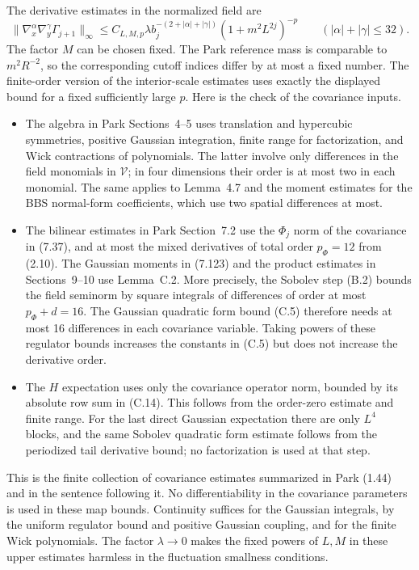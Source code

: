 \documentclass[11pt]{article}
\begin{document}
The derivative estimates in the normalized field are
\[
 \|\nabla_x^\alpha\nabla_y^\gamma\Gamma_{j+1}\|_\infty
 \le C_{L,M,p}\lambda b_j^{-(2+|\alpha|+|\gamma|)}
                   (1+m^2L^{2j})^{-p}
 \qquad (|\alpha|+|\gamma|\le 32).
\]
The factor \(M\) can be chosen fixed. The Park reference mass
is comparable to \(m^2 R^{-2}\), so the corresponding cutoff
indices differ by at most a fixed number. The finite-order version
of the interior-scale estimates uses exactly the displayed bound
for a fixed sufficiently large \(p\). Here is the check of the
covariance inputs.
\begin{itemize}
\item The algebra in Park Sections~4--5 uses translation and
hypercubic symmetries, positive Gaussian integration, finite
range for factorization, and Wick contractions of polynomials.
The latter involve only differences in the field monomials
in \(\mathcal V\); in four dimensions their order is at most
two in each monomial. The same applies to Lemma~4.7 and the
moment estimates for the BBS normal-form coefficients, which
use two spatial differences at most.
\item The bilinear estimates in Park Section~7.2 use the
\(\Phi_j\) norm of the covariance in (7.37), and at most
the mixed derivatives of total order \(p_\Phi=12\) from
(2.10). The Gaussian moments in (7.123) and the product
estimates in Sections~9--10 use Lemma~C.2. More precisely,
the Sobolev step (B.2) bounds the field seminorm by square
integrals of differences of order at most \(p_\Phi+d=16\).
The Gaussian quadratic form bound (C.5) therefore needs
at most 16 differences in each covariance variable.
Taking powers of these regulator bounds increases the
constants in (C.5) but does not increase the derivative order.
\item The \(H\) expectation uses only the covariance operator
norm, bounded by its absolute row sum in (C.14). This follows
from the order-zero estimate and finite range. For the last
direct Gaussian expectation there are only \(L^4\) blocks,
and the same Sobolev quadratic form estimate follows from
the periodized tail derivative bound; no factorization is
used at that step.
\end{itemize}
This is the finite collection of covariance estimates summarized
in Park (1.44) and in the sentence following it. No
differentiability in the covariance parameters is used in
these map bounds. Continuity suffices for the Gaussian
integrals, by the uniform regulator bound and positive
Gaussian coupling, and for the finite Wick polynomials.
The factor \(\lambda\to0\) makes the fixed powers of \(L,M\)
in these upper estimates harmless in the fluctuation
smallness conditions.
\end{document}
